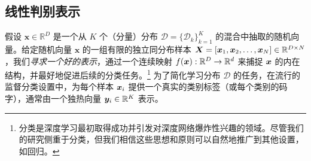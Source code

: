 \documentclass[../../book-main_zh.tex]{subfiles}
\begin{document}





\subsection{线性判别表示}\label{subsec:LDR}

假设 $\bm{x} \in \mathbb{R}^D$ 是一个从 $K$ 个（分量）分布 $\mathcal{D} = \{\mathcal{D}_k\}_{k=1}^K$ 的混合中抽取的随机向量。给定随机向量 $\bm x$ 的一组有限的独立同分布样本 $\bm{X} = [\bm{x}_1, \bm{x}_2, \ldots, \bm{x}_N] \in \mathbb{R}^{D\times N}$，我们{\em 寻求一个好的表示}，通过一个连续映射 $f(\bm{x}): \mathbb{R}^D \rightarrow \mathbb{R}^d$ 来捕捉 $\bm{x}$ 的内在结构，并最好地促进后续的分类任务。\footnote{分类是深度学习最初取得成功并引发对深度网络爆炸性兴趣的领域。尽管我们的研究侧重于分类，但我们相信这些思想和原则可以自然地推广到其他设置，如回归。} 为了简化学习分布 $\mathcal{D}$ 的任务，在流行的监督分类设置中，为每个样本 $\bm{x}_i$ 提供一个真实的类别标签（或每个类别的码字），通常由一个独热向量 $\bm{y}_i \in \mathbb{R}^K$ 表示。

 

\end{document}
